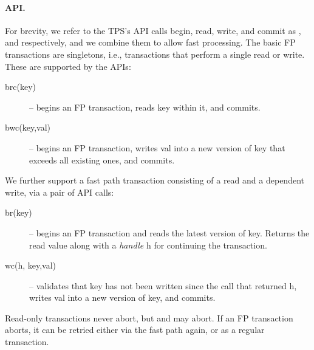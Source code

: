 \paragraph{API.}
For brevity, we refer to the TPS's API calls  begin, read, write, and commit as , and  respectively, and 
we combine them to allow fast processing.
The basic FP transactions are singletons, i.e., transactions that perform a single
read or write. These are supported by the APIs: 
\begin{description}
\item[brc(key)] -- begins an FP transaction, reads key within it, and commits.
\item[bwc(key,val)] -- begins an FP transaction,  writes val into a new version of key that exceeds all existing ones, and commits.
\end{description}

We further support a fast path transaction consisting of a read and a dependent write, via a pair of API calls:
\begin{description}
\item[br(key)] -- begins an FP transaction and  reads the latest version of key. 
Returns the read value along with a \emph{handle} h for continuing the transaction.
\item[wc(h, key,val)] -- 	validates that key has not been written since the   call that returned h, writes val into a new version of key, and commits.
\end{description}

Read-only transactions never abort, but  and  may abort. 
If an FP transaction aborts, it can be retried either via the fast path again, or as a regular transaction.


